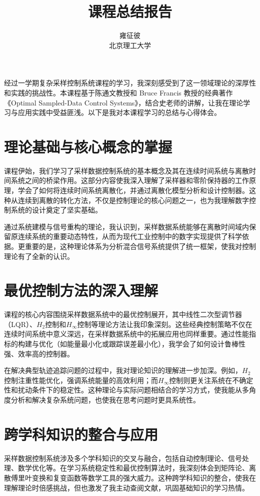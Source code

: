 \documentclass[lang=cn,a4paper,newtx]{elegantpaper}
\title{课程总结报告}
\author{雍征彼 \\ 北京理工大学}
\institute{}
\date{\zhdate{2024/11/18}}
\begin{document}
\maketitle

经过一学期复杂采样控制系统课程的学习，我深刻感受到了这一领域理论的深厚性和实践的挑战性。本课程基于陈通文教授和 Bruce Francis 教授的经典著作《Optimal Sampled-Data Control Systems》，结合史老师的讲解，让我在理论学习与应用实践中受益匪浅。以下是我对本课程学习的总结与心得体会。

\section{理论基础与核心概念的掌握}
课程伊始，我们学习了采样数据控制系统的基本概念及其在连续时间系统与离散时间系统之间的桥梁作用。这部分内容使我深入理解了采样器和零阶保持器的工作原理，学会了如何将连续时间系统离散化，并通过离散化模型分析和设计控制器。这种从连续到离散的转化方法，不仅是控制理论的核心问题之一，也为我理解数字控制系统的设计奠定了坚实基础。

通过系统建模与信号重构的理论，我认识到，采样数据系统能够在离散时间域内保留原连续系统的重要动态特性，从而为现代工业控制中的数字实现提供了科学依据。更重要的是，这种理论体系为分析混合信号系统提供了统一框架，使我对控制理论有了全新的认识。

\section{最优控制方法的深入理解}
课程的核心内容围绕采样数据系统中的最优控制展开，其中线性二次型调节器（LQR）、$H_2$控制和$H_\infty$控制等理论方法让我印象深刻。这些经典控制策略不仅在连续时间系统中意义深远，在采样数据系统中的拓展应用也同样重要。通过性能指标的构建与优化（如能量最小化或跟踪误差最小化），我学会了如何设计鲁棒性强、效率高的控制器。

在解决典型轨迹追踪问题的过程中，我对理论知识的理解进一步加深。例如，$H_2$控制注重性能优化，强调系统能量的高效利用；而$H_\infty$控制则更关注系统在不确定性和扰动条件下的稳定性。这种理论与实际问题相结合的学习方式，使我能从多角度分析和解决复杂系统问题，也使我在思考问题时更具系统性。

\section{跨学科知识的整合与应用}
采样数据控制系统涉及多个学科知识的交叉与融合，包括自动控制理论、信号处理、数学优化等。在学习系统稳定性和最优控制算法时，我深刻体会到矩阵论、离散傅里叶变换和复变函数等数学工具的强大威力。这种跨学科知识的整合，使我在理解理论时倍感挑战，但也激发了我主动查阅文献，巩固基础知识的学习热情。
\end{document}
